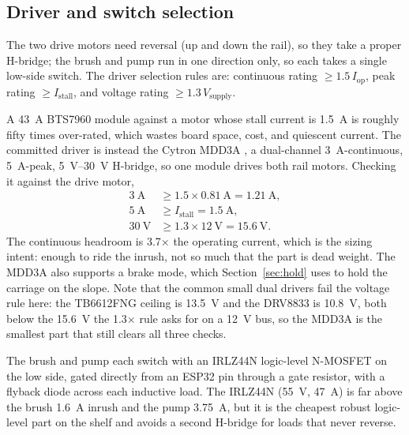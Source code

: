 \documentclass[11pt,a4paper]{article}
\begin{document}
\subsection{Driver and switch selection}
\label{sec:driver}

The two drive motors need reversal (up and down the rail), so they take a
proper H-bridge; the brush and pump run in one direction only, so each takes a
single low-side switch. The driver selection rules are: continuous rating
$\geq 1.5\,I_{\text{op}}$, peak rating $\geq I_{\text{stall}}$, and voltage
rating $\geq 1.3\,V_{\text{supply}}$.

A \SI{43}{\ampere} BTS7960 module against a motor whose stall current is
\SI{1.5}{\ampere} is roughly fifty times over-rated, which wastes board space,
cost, and quiescent current. The committed driver is instead the Cytron MDD3A
\cite{cytronmdd3a}, a dual-channel \SI{3}{\ampere}-continuous,
\SI{5}{\ampere}-peak, \SIrange{5}{30}{\volt} H-bridge, so one module drives both
rail motors. Checking it against the drive motor,
\begin{align}
  \SI{3}{\ampere} &\geq 1.5\times\SI{0.81}{\ampere} = \SI{1.21}{\ampere}, \\
  \SI{5}{\ampere} &\geq I_{\text{stall}} = \SI{1.5}{\ampere}, \\
  \SI{30}{\volt}  &\geq 1.3\times\SI{12}{\volt} = \SI{15.6}{\volt}.
  \label{eq:mdd3a}
\end{align}
The continuous headroom is \num{3.7}$\times$ the operating current, which is the
sizing intent: enough to ride the inrush, not so much that the part is dead
weight. The MDD3A also supports a brake mode, which Section~\ref{sec:hold} uses
to hold the carriage on the slope. Note that the common small dual drivers fail
the voltage rule here: the TB6612FNG ceiling is \SI{13.5}{\volt} and the DRV8833
is \SI{10.8}{\volt}, both below the \SI{15.6}{\volt} the \num{1.3}$\times$ rule
asks for on a \SI{12}{\volt} bus, so the MDD3A is the smallest part that still
clears all three checks.

The brush and pump each switch with an IRLZ44N logic-level N-MOSFET
\cite{irlz44nds} on the low side, gated directly from an ESP32 pin through a gate
resistor, with a flyback diode across each inductive load. The IRLZ44N
(\SI{55}{\volt}, \SI{47}{\ampere}) is far above the brush \SI{1.6}{\ampere}
inrush and the pump \SI{3.75}{\ampere}, but it is the cheapest robust
logic-level part on the shelf and avoids a second H-bridge for loads that never
reverse.
\end{document}
